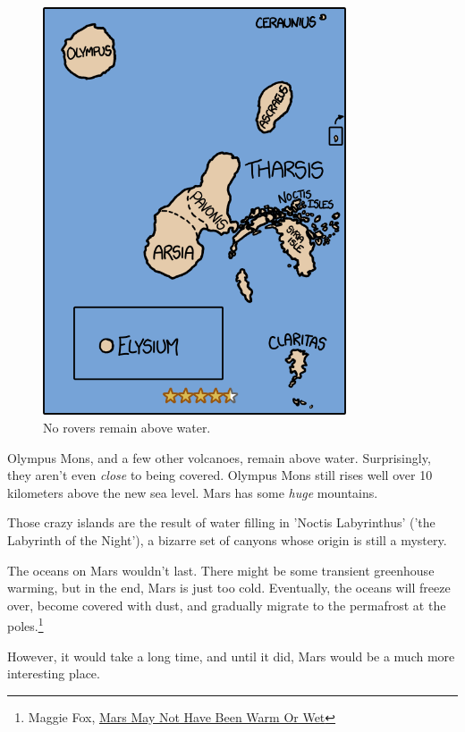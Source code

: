 {\begin{figure}[!htbp]
\centering
\includegraphics[scale=0.5, max width=0.8\textwidth]{imgs/a/54/mars_12.png}
\caption{No rovers remain above water.}
\end{figure}

{Olympus Mons, and a few other volcanoes, remain above water. Surprisingly, they aren't even \emph{close} to being covered. Olympus Mons still rises well over 10 kilometers above the new sea level. Mars has some \emph{huge} mountains.}

{Those crazy islands are the result of water filling in 'Noctis Labyrinthus' ('the Labyrinth of the Night'), a bizarre set of canyons whose origin is still a mystery.}

{The oceans on Mars wouldn't last. There might be some transient greenhouse warming, but in the end, Mars is just too cold. Eventually, the oceans will freeze over, become covered with dust, and gradually migrate to the permafrost at the poles.{\footnote{Maggie Fox, \href{http://rense.com/general32/marsmaynothave.htm}{Mars May Not Have Been Warm Or Wet}} } }

{However, it would take a long time, and until it did, Mars would be a much more interesting place.}

}

